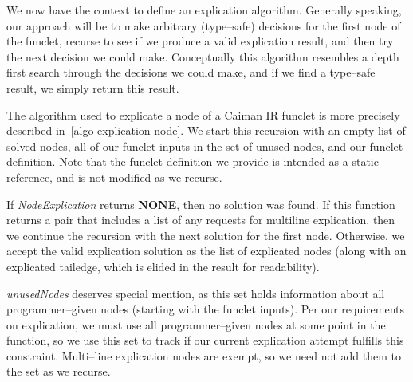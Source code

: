 We now have the context to define an explication algorithm.  Generally speaking, our approach will be to make arbitrary (type--safe) decisions for the first node of the funclet, recurse to see if we produce a valid explication result, and then try the next decision we could make.  Conceptually this algorithm resembles a depth first search through the decisions we could make, and if we find a type--safe result, we simply return this result.

The algorithm used to explicate a node of a Caiman IR funclet is more precisely described in~\ref{algo-explication-node}.  We start this recursion with an empty list of solved nodes, all of our funclet inputs in the set of unused nodes, and our funclet definition.  Note that the funclet definition we provide is intended as a static reference, and is not modified as we recurse.  

If \textit{NodeExplication} returns \textbf{NONE}, then no solution was found.  If this function returns a pair that includes a list of any requests for multiline explication, then we continue the recursion with the next solution for the first node.  Otherwise, we accept the valid explication solution as the list of explicated nodes (along with an explicated tailedge, which is elided in the result for readability).

\textit{unusedNodes} deserves special mention, as this set holds information about all programmer--given nodes (starting with the funclet inputs).  Per our requirements on explication, we must use all programmer--given nodes at some point in the function, so we use this set to track if our current explication attempt fulfills this constraint.  Multi--line explication nodes are exempt, so we need not add them to the set as we recurse.

